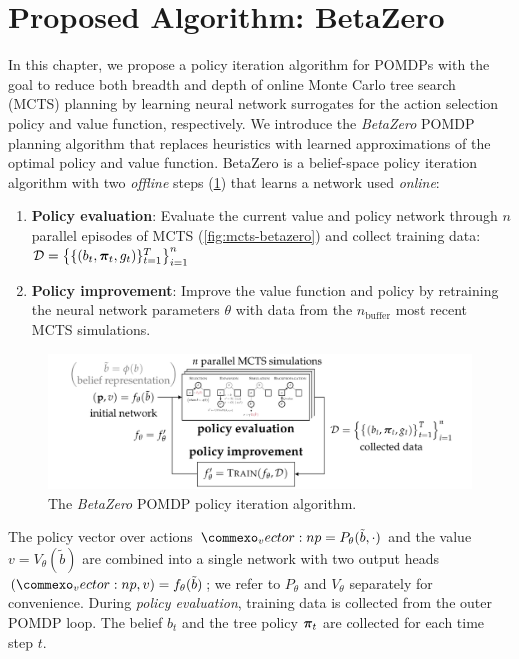 \section{Proposed Algorithm: BetaZero}\label{sec:betazero}
In this chapter, we propose a policy iteration algorithm for POMDPs with the goal to reduce both breadth and depth of online Monte Carlo tree search (MCTS) planning by learning neural network surrogates for the action selection policy and value function, respectively.
We introduce the \textit{BetaZero} POMDP planning algorithm that replaces heuristics with learned approximations of the optimal policy and value function.
BetaZero is a belief-space policy iteration algorithm with two \textit{offline} steps (\cref{fig:betazero-alg}) that learns a network used \textit{online}:
\begin{enumerate}
    \item \textbf{Policy evaluation}: Evaluate the current value and policy network through $n$ parallel episodes of MCTS (\cref{fig:mcts-betazero}) and collect training data: $\mathcal{D} = \left\{\{(b_t, \boldsymbol\pi_t, g_t)\}_{t=1}^T\right\}_{i=1}^n$
    \item \textbf{Policy improvement}: Improve the value function and policy by retraining the neural network parameters $\theta$ with data from the $n_\text{buffer}$ most recent MCTS simulations.
\end{enumerate}
\begin{figure}[t]
    \centering
    \includegraphics[width=0.91\linewidth]{diagrams/betazero/betazero-policy-iteration.pdf}
    \caption{The \textit{BetaZero} POMDP policy iteration algorithm.}
    \label{fig:betazero-alg}
\end{figure}
The policy vector over actions $\vect{p} = P_\theta(\tilde{b}, \cdot)$ and the value $v = V_\theta(\tilde{b})$ are combined into a single network with two output heads $(\vect{p}, v) = f_\theta(\tilde{b})$; we refer to $P_\theta$ and $V_\theta$ separately for convenience.
During \textit{policy evaluation}, training data is collected from the outer POMDP loop.
The belief $b_t$ and the tree policy $\boldsymbol\pi_t$ are collected for each time step $t$.
